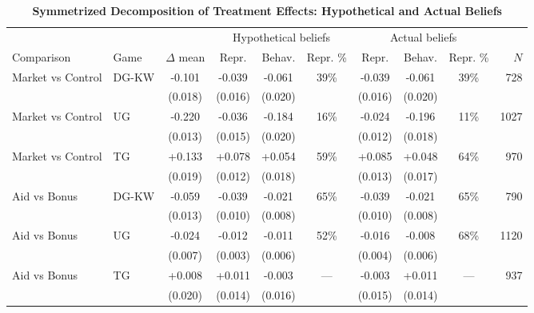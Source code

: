 \begin{table}[!htbp]
\centering
\footnotesize
\renewcommand{\arraystretch}{1.15}
\setlength{\tabcolsep}{4pt}
\caption{\textbf{Symmetrized Decomposition of Treatment Effects: Hypothetical and Actual Beliefs}}
\label{tab:oaxaca_catbelief}
\begin{tabular}{ll c ccc ccc r}
\toprule
& & & \multicolumn{3}{c}{Hypothetical beliefs} & \multicolumn{3}{c}{Actual beliefs} & \\
\cmidrule(lr){4-6}\cmidrule(lr){7-9}
Comparison & Game & $\Delta$ mean & Repr. & Behav. & Repr. \% &
Repr. & Behav. & Repr. \% & $N$ \\
\midrule
Market vs Control & DG-KW & -0.101 & -0.039 & -0.061 & 39\% & -0.039 & -0.061 & 39\% & 728 \\
 & & (0.018) & (0.016) & (0.020) & & (0.016) & (0.020) & & \\
\addlinespace[2pt]
Market vs Control & UG & -0.220 & -0.036 & -0.184 & 16\% & -0.024 & -0.196 & 11\% & 1027 \\
 & & (0.013) & (0.015) & (0.020) & & (0.012) & (0.018) & & \\
\addlinespace[2pt]
Market vs Control & TG & +0.133 & +0.078 & +0.054 & 59\% & +0.085 & +0.048 & 64\% & 970 \\
 & & (0.019) & (0.012) & (0.018) & & (0.013) & (0.017) & & \\
\addlinespace[2pt]
Aid vs Bonus & DG-KW & -0.059 & -0.039 & -0.021 & 65\% & -0.039 & -0.021 & 65\% & 790 \\
 & & (0.013) & (0.010) & (0.008) & & (0.010) & (0.008) & & \\
\addlinespace[2pt]
Aid vs Bonus & UG & -0.024 & -0.012 & -0.011 & 52\% & -0.016 & -0.008 & 68\% & 1120 \\
 & & (0.007) & (0.003) & (0.006) & & (0.004) & (0.006) & & \\
\addlinespace[2pt]
Aid vs Bonus & TG & +0.008 & +0.011 & -0.003 & --- & -0.003 & +0.011 & --- & 937 \\
 & & (0.020) & (0.014) & (0.016) & & (0.015) & (0.014) & & \\
\bottomrule
\end{tabular}
\begin{flushleft}

\end{flushleft}
\end{table}
